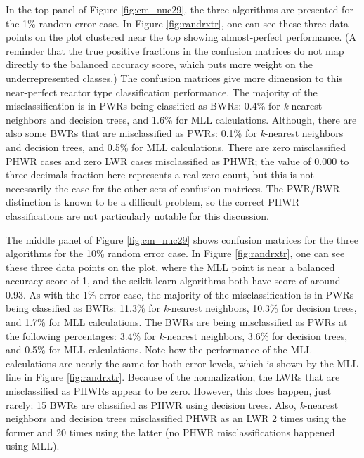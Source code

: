 In the top panel of Figure \ref{fig:cm_nuc29}, the three algorithms are
presented for the 1\% random error case. In Figure \ref{fig:randrxtr}, one can
see these three data points on the plot clustered near the top showing
almost-perfect performance.  (A reminder that the true positive fractions in
the confusion matrices do not map directly to the balanced accuracy score,
which puts more weight on the underrepresented classes.) The confusion matrices
give more dimension to this near-perfect reactor type classification
performance. The majority of the misclassification is in \gls{PWR}s being
classified as \gls{BWR}s: 0.4\% for \textit{k}-nearest neighbors and decision
trees, and 1.6\% for \gls{MLL} calculations. Although, there are also some
\gls{BWR}s that are misclassified as \gls{PWR}s: 0.1\% for \textit{k}-nearest
neighbors and decision trees, and 0.5\% for \gls{MLL} calculations.  There are
zero misclassified \gls{PHWR} cases and zero \gls{LWR} cases misclassified as
\gls{PHWR}; the value of 0.000 to three decimals fraction here represents a
real zero-count, but this is not necessarily the case for the other sets of
confusion matrices.  The \gls{PWR}/\gls{BWR} distinction is known to be a
difficult problem, so the correct \gls{PHWR} classifications are not
particularly notable for this discussion. 

The middle panel of Figure \ref{fig:cm_nuc29} shows confusion matrices for the
three algorithms for the 10\% random error case. In Figure \ref{fig:randrxtr},
one can see these three data points on the plot, where the \gls{MLL} point is
near a balanced accuracy score of 1, and the scikit-learn algorithms both have
score of around 0.93. As with the 1\% error case, the majority of the
misclassification is in \gls{PWR}s being classified as \gls{BWR}s: 11.3\% for
\textit{k}-nearest neighbors, 10.3\% for decision trees, and 1.7\% for
\gls{MLL} calculations.  The \gls{BWR}s are being misclassified as \gls{PWR}s
at the following percentages: 3.4\% for \textit{k}-nearest neighbors, 3.6\% for
decision trees, and 0.5\% for \gls{MLL} calculations. Note how the performance
of the \gls{MLL} calculations are nearly the same for both error levels, which
is shown by the \gls{MLL} line in Figure \ref{fig:randrxtr}. Because of the
normalization, the \gls{LWR}s that are misclassified as \gls{PHWR}s appear to
be zero. However, this does happen, just rarely: 15 \gls{BWR}s are classified
as \gls{PHWR} using decision trees. Also, \textit{k}-nearest neighbors and
decision trees misclassified \gls{PHWR} as an \gls{LWR} 2 times using the
former and 20 times using the latter (no \gls{PHWR} misclassifications happened
using \gls{MLL}).

